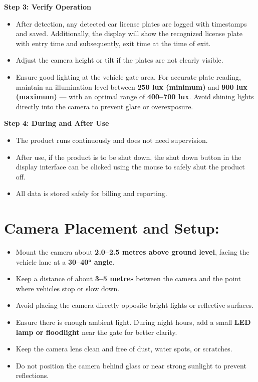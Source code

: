 \vspace{0.3cm}
\noindent
\textbf{Step 3: Verify Operation}
\begin{itemize}
	\item After detection, any detected car license plates are logged with timestamps and saved. Additionally, the display will show the recognized license plate with entry time and subsequently, exit time at the time of exit.  
	\item Adjust the camera height or tilt if the plates are not clearly visible.
\item Ensure good lighting at the vehicle gate area.
For accurate plate reading, maintain an illumination level between 
\textbf{250 lux (minimum)} and \textbf{900 lux (maximum)} — with an 
optimal range of \textbf{400–700 lux}. 
Avoid shining lights directly into the camera to prevent glare or overexposure.
\end{itemize}

\vspace{0.3cm}
\noindent
\textbf{Step 4: During and After Use}
\begin{itemize}
	\item The product runs continuously and does not need supervision.  
	\item After use, if the product is to be shut down, the shut down button in the display interface can be clicked using the mouse to safely shut the product off.   
	\item All data is stored safely for billing and reporting.
\end{itemize}

\vspace{0.5cm}
\noindent

\vspace{0.8em}
\noindent
\section{Camera Placement and Setup:}
\begin{itemize}
	\item Mount the camera about \textbf{2.0–2.5 metres above ground level}, facing the vehicle lane at a \textbf{30–40° angle}.
	\item Keep a distance of about \textbf{3–5 metres} between the camera and the point where vehicles stop or slow down.
	\item Avoid placing the camera directly opposite bright lights or reflective surfaces.
	\item Ensure there is enough ambient light. During night hours, add a small \textbf{LED lamp or floodlight} near the gate for better clarity.
	\item Keep the camera lens clean and free of dust, water spots, or scratches.
	\item Do not position the camera behind glass or near strong sunlight to prevent reflections.
\end{itemize}

